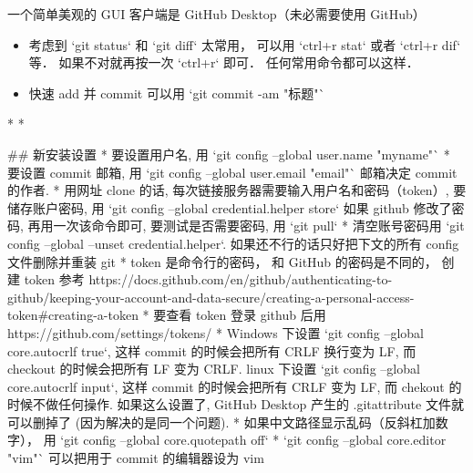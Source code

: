 

一个简单美观的 GUI 客户端是 GitHub Desktop（未必需要使用 GitHub）


\begin{itemize}
\item 考虑到 `git status` 和 `git diff` 太常用， 可以用 `ctrl+r stat` 或者 `ctrl+r dif` 等． 如果不对就再按一次 `ctrl+r` 即可． 任何常用命令都可以这样．
\item 快速 add 并 commit 可以用 `git commit -am "标题"`
\end{itemize}

* 
* 

## 新安装设置
* 要设置用户名, 用 `git config --global user.name "myname"`
* 要设置 commit 邮箱, 用 `git config --global user.email "email"`  邮箱决定 commit 的作者.
* 用网址 clone 的话, 每次链接服务器需要输入用户名和密码（token）, 要储存账户密码, 用 `git config --global credential.helper store` 如果 github 修改了密码, 再用一次该命令即可, 要测试是否需要密码, 用 `git pull`
* 清空账号密码用 `git config --global --unset credential.helper`. 如果还不行的话只好把下文的所有 config 文件删除并重装 git
* token 是命令行的密码， 和 GitHub 的密码是不同的， 创建 token 参考 https://docs.github.com/en/github/authenticating-to-github/keeping-your-account-and-data-secure/creating-a-personal-access-token#creating-a-token
* 要查看 token 登录 github 后用 https://github.com/settings/tokens/
* Windows 下设置 `git config --global core.autocrlf true`, 这样 commit 的时候会把所有 CRLF 换行变为 LF, 而 checkout 的时候会把所有 LF 变为 CRLF. linux 下设置 `git config --global core.autocrlf input`, 这样 commit 的时候会把所有 CRLF 变为 LF, 而 chekout 的时候不做任何操作. 如果这么设置了, GitHub Desktop 产生的 .gitattribute 文件就可以删掉了 (因为解决的是同一个问题).
* 如果中文路径显示乱码（反斜杠加数字）， 用 `git config --global core.quotepath off`
*  `git config --global core.editor "vim"` 可以把用于 commit 的编辑器设为 vim

